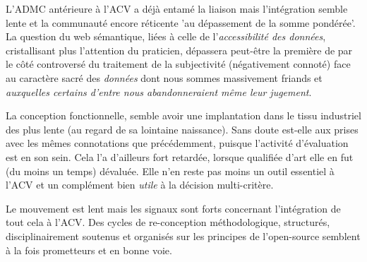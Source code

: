L'\gls{ADMC} antérieure à l'\gls{ACV} a déjà entamé la liaison mais l'intégration semble lente et la communauté encore réticente 'au dépassement de la somme pondérée'.
La question du web sémantique, liées à celle de l'\emph{accessibilité des données}, cristallisant plus l'attention du praticien, dépassera peut-être la première de par le côté controversé du traitement de la subjectivité (négativement connoté) face au caractère sacré des \emph{données} dont nous sommes massivement friands et \emph{auxquelles certains d'entre nous abandonneraient même leur jugement}.

La conception fonctionnelle, semble avoir une implantation dans le tissu industriel des plus lente (au regard de sa lointaine naissance).
Sans doute est-elle aux prises avec les mêmes connotations que précédemment, puisque l'activité d'évaluation est en son sein.
Cela l'a d'ailleurs fort retardée, lorsque qualifiée d'art elle en fut (du moins un temps) dévaluée.
Elle n'en reste pas moins un outil essentiel à l'\gls{ACV} et un complément bien \textit{utile} à la décision multi-critère.

Le mouvement est lent mais les signaux sont forts concernant l'intégration de tout cela à l'\gls{ACV}.
Des cycles de re-conception méthodologique, structurés, disciplinairement soutenus et organisés sur les principes de l'open-source semblent à la fois prometteurs et en bonne voie.